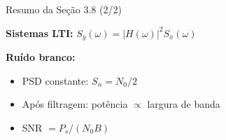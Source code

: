 \begin{frame}{Resumo da Seção 3.8 (2/2)}

\textbf{Sistemas LTI:} $S_y(\omega) = |H(\omega)|^2 S_x(\omega)$

\vspace{0.3cm}

\textbf{Ruído branco:}
\begin{itemize}
\item PSD constante: $S_n = N_0/2$
\item Após filtragem: potência $\propto$ largura de banda
\item SNR $= P_s/(N_0 B)$
\end{itemize}

\end{frame}
